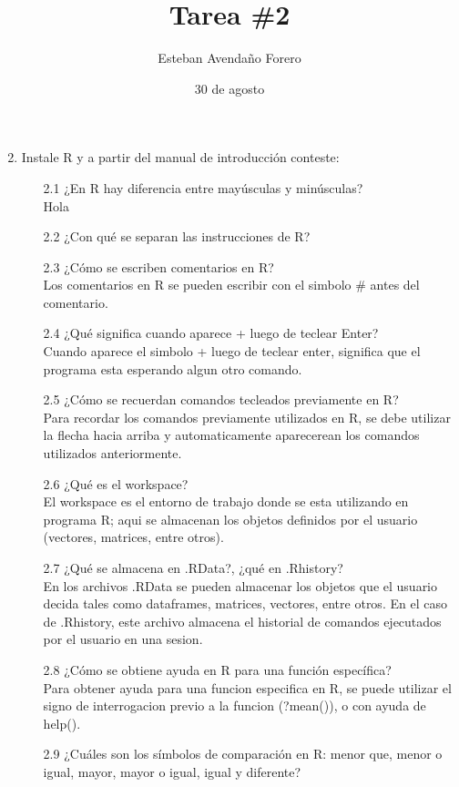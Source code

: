 \documentclass[letterpaper, 12pt]{article}
\title{Tarea \#2}
\author{Esteban Avendaño Forero}
\date{30 de agosto}
\begin{document}

\maketitle

\begin{enumerate}
\setcounter{enumi}{1}
\item Instale R y a partir del manual de introducción conteste:
\begin{enumerate}
\item[2.1] ¿En R hay diferencia entre mayúsculas y minúsculas?\\
Hola
\item[2.2] ¿Con qué se separan las instrucciones de R?
\item[2.3] ¿Cómo se escriben comentarios en R?\\
Los comentarios en R se pueden escribir con el simbolo \# antes del comentario.
\item[2.4] ¿Qué significa cuando aparece + luego de teclear Enter?\\
Cuando aparece el simbolo + luego de teclear enter, significa que el programa esta esperando algun otro comando.
\item[2.5] ¿Cómo se recuerdan comandos tecleados previamente en R?\\
Para recordar los comandos previamente utilizados en R, se debe utilizar la flecha hacia arriba y automaticamente aparecerean los comandos utilizados anteriormente.
\item[2.6] ¿Qué es el workspace?\\
El workspace es el entorno de trabajo donde se esta utilizando en programa R; aqui se almacenan los objetos definidos por el usuario (vectores, matrices, entre otros).
\item[2.7] ¿Qué se almacena en .RData?, ¿qué en .Rhistory?\\
En los archivos .RData se pueden almacenar los objetos que el usuario decida tales como dataframes, matrices, vectores, entre otros. En el caso de .Rhistory, este archivo almacena el historial de comandos ejecutados por el usuario en una sesion.
\item[2.8] ¿Cómo se obtiene ayuda en R para una función específica?\\
Para obtener ayuda para una funcion especifica en R, se puede utilizar el signo de interrogacion previo a la funcion (?mean()), o con ayuda de help().
\item[2.9] ¿Cuáles son los símbolos de comparación en R: menor que, menor o igual, mayor, mayor o igual, igual y diferente?\\

\end{enumerate}
\end{enumerate}
\end{document}
